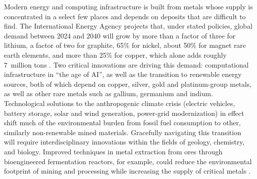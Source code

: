 %
%      
%
%
%

Modern energy and computing infrastructure is built from metals whose supply is
concentrated in a select few places and depends on deposits that are difficult to find.
The International Energy Agency projects that, under stated policies, global
demand between 2024 and 2040 will grow by more than a factor of three for
lithium, a factor of two for graphite, 65\% for nickel, about 50\% for magnet rare
earth elements, and more than 25\% for copper, which alone adds roughly 7~million
tons \citep{iea2026}. Two critical innovations are driving this demand: computational infrastructure
in ``the age of AI'', as well as the transition to renewable energy sources, both of which depend on copper, silver, gold and
platinum-group metals, as well as other rare metals such as gallium, germanium and
indium. Technological solutions to the anthropogenic climate crisis
(electric vehicles, battery storage, solar and wind generation, power-grid modernization) 
in effect shift much of the environmental burden from fossil fuel consumption to other, similarly non-renewable
mined materials. Gracefully navigating this transition will require interdisciplinary innovations within the fields of 
geology, chemistry, and biology. Improved techniques in metal extraction from ores through bioengineered fermentation reactors, for example, 
could reduce the environmental footprint of mining and processing while increasing the supply of critical metals \citep{fernando2024}.

